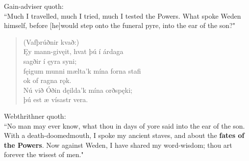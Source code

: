 \bvb Gain-adviser quoth: \\ “Much I travelled, much I tried, much I tested the Powers. What spoke Weden himself, before [he]\footnotemark[115] would step onto the funeral pyre, into the ear of the son?" \\

\begin{verse}
(Vafþrúðnir kvað:) \\%
\bva Ęy mann-gi\footnotemark[40] vęit, \hld hvat þú í árdaga \\%
\ind sagðir í ęyra syni; \\%
fęigum munni \hld mælta'k mína forna stafi \\%
\ind ok of ragna rǫk. \\%
Nú við Óðin \hld dęilda'k mína orðspęki; \\%
\ind þú est æ vísastr vera.\\%
\end{verse}

\bvb Webthrithner quoth: \\ “No man may ever know\footnotemark[119], what thou in days of yore said into the ear of the son. With a death-doomed\footnotemark[120] mouth, I spoke my ancient staves, and about the \textbf{fates of the Powers}\footnotemark[121]. Now against Weden, I have shared my word-wisdom\footnotemark[122]; thou art forever the wisest of men\footnotemark[123]." \\
